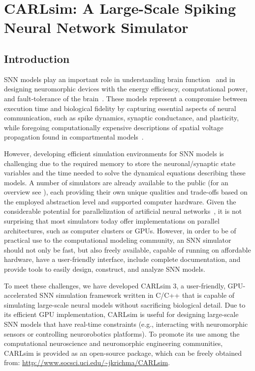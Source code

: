 \chapter{CARLsim: A Large-Scale Spiking Neural Network Simulator}
\label{ch:SNN}

\section{Introduction}
\label{sec:SNN|introduction}
\acf{SNN} models play an important role in understanding brain
function~\citep{Maass1997,Rieke1999,Eliasmith2012} and in designing neuromorphic devices with
the energy efficiency, computational power, and fault-tolerance of the
brain~\citep{Boahen2006,Cassidy2014,Khan2008,Minkovich2014,Schemmel2010}.
These models represent a compromise between execution time and biological
fidelity by capturing essential aspects of neural communication, such as
spike dynamics, synaptic conductance, and plasticity, while foregoing
computationally expensive descriptions of spatial voltage propagation found
in compartmental models~\citep{Koch2004,Izhikevich2007}.

However, developing efficient simulation environments for \ac{SNN} models is
challenging due to the required memory to store the neuronal/synaptic state
variables and the time needed to solve the dynamical equations describing
these models.
A number of simulators are already available to the public
(for an overview see \cite{Brette2007,Beyeler2015a}),
each providing their own unique qualities and trade-offs based on the 
employed abstraction level and supported computer hardware.
Given the considerable potential for parallelization of artificial neural
networks~\citep{Nordstrom1992}, it is not surprising that most simulators
today offer implementations on parallel architectures,
such as computer clusters or \acp{GPU}.
However, in order to be of practical use to the computational modeling
community, an SNN simulator should not only be fast,
but also freely available,
capable of running on affordable hardware,
have a user-friendly interface,
include complete documentation,
and provide tools to easily design, construct, and analyze \ac{SNN} models.

To meet these challenges, we have developed CARLsim 3, a user-friendly,
\ac{GPU}-accelerated \ac{SNN} simulation framework written in C/C++ that is capable of
simulating large-scale neural models without sacrificing biological detail.
Due to its efficient \ac{GPU} implementation, CARLsim is useful for designing
large-scale SNN models that have real-time constraints (e.g., interacting
with neuromorphic sensors or controlling neurorobotics platforms).
To promote its use among the computational neuroscience and neuromorphic
engineering communities, CARLsim is provided as an open-source package,
which can be freely obtained from: \url{http://www.socsci.uci.edu/~jkrichma/CARLsim}.


